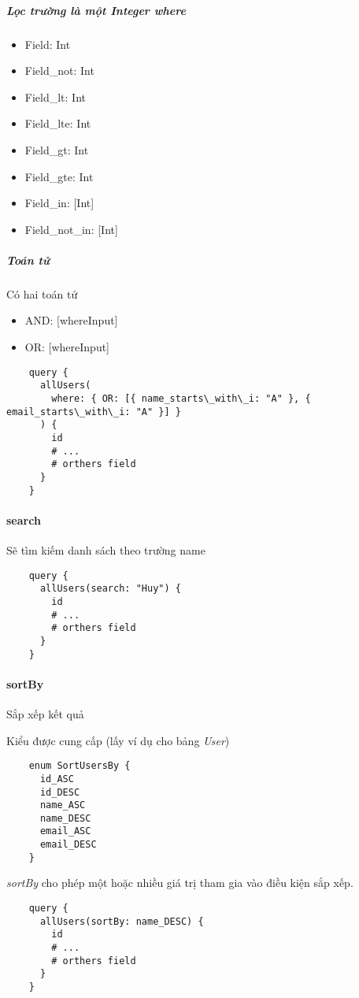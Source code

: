 \subparagraph{Lọc trường là một Integer \emph{where}}
\begin{itemize}
	\item {Field}: Int
	\item {Field\_not}: Int
	\item {Field\_lt}: Int
	\item {Field\_lte}: Int
	\item {Field\_gt}: Int
	\item {Field\_gte}: Int
	\item {Field\_in}: [Int]
	\item {Field\_not\_in}: [Int]
\end{itemize}
\subparagraph{Toán tử}
Có hai toán tử
\begin{itemize}
	\item {AND}: [whereInput]
	\item {OR}: [whereInput]
\end{itemize}
\begin{lstlisting}
	query {
	  allUsers(
	    where: { OR: [{ name_starts\_with\_i: "A" }, { email_starts\_with\_i: "A" }] }
	  ) {
	    id
	    # ...
	    # orthers field
	  }
	}
\end{lstlisting}

\paragraph{search}

Sẽ tìm kiếm danh sách theo trường {name}

\begin{lstlisting}
	query {
	  allUsers(search: "Huy") {
	    id
	    # ...
	    # orthers field
	  }
	}
\end{lstlisting}

\paragraph{sortBy}

Sắp xếp kết quả

Kiểu được cung cấp (lấy ví dụ cho bảng \emph{User})

\begin{lstlisting}
	enum SortUsersBy {
	  id_ASC
	  id_DESC
	  name_ASC
	  name_DESC
	  email_ASC
	  email_DESC
	}
\end{lstlisting}

\emph{sortBy} cho phép một hoặc nhiều giá trị tham gia vào điều kiện sắp xếp.

\begin{lstlisting}
	query {
	  allUsers(sortBy: name_DESC) {
	    id
	    # ...
	    # orthers field
	  }
	}
\end{lstlisting}

